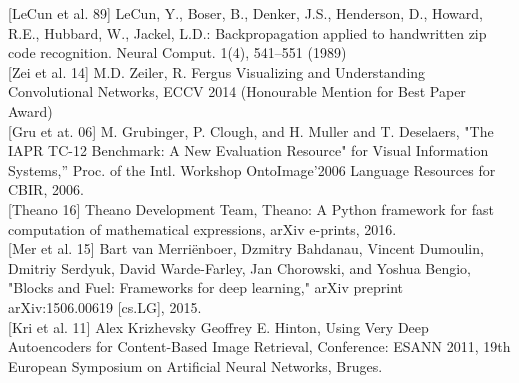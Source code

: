 [LeCun et al. 89] LeCun, Y., Boser, B., Denker, J.S., Henderson, D., Howard, R.E., Hubbard, W., Jackel, L.D.: Backpropagation applied to handwritten zip code recognition. Neural
Comput. 1(4), 541–551 (1989)\\

[Zei et al. 14] M.D. Zeiler, R. Fergus Visualizing and Understanding Convolutional Networks, ECCV 2014 (Honourable Mention for Best Paper Award)\\

[Gru et at. 06] M. Grubinger, P. Clough, and H. Muller and T. Deselaers, "The IAPR TC-12 Benchmark: A New Evaluation Resource" for Visual Information Systems,” Proc. of the Intl. Workshop OntoImage’2006 Language Resources for CBIR, 2006.\\

[Theano 16] Theano Development Team, Theano: A {Python} framework for fast computation of mathematical expressions, arXiv e-prints, 2016.\\

[Mer et al. 15] Bart van Merriënboer, Dzmitry Bahdanau, Vincent Dumoulin, Dmitriy Serdyuk, David Warde-Farley, Jan Chorowski, and Yoshua Bengio, "Blocks and Fuel: Frameworks for deep learning," arXiv preprint arXiv:1506.00619 [cs.LG], 2015.\\

[Kri et al. 11] Alex Krizhevsky Geoffrey E. Hinton, Using Very Deep Autoencoders for Content-Based Image Retrieval, Conference: ESANN 2011, 19th European Symposium on Artificial Neural Networks, Bruges.\\